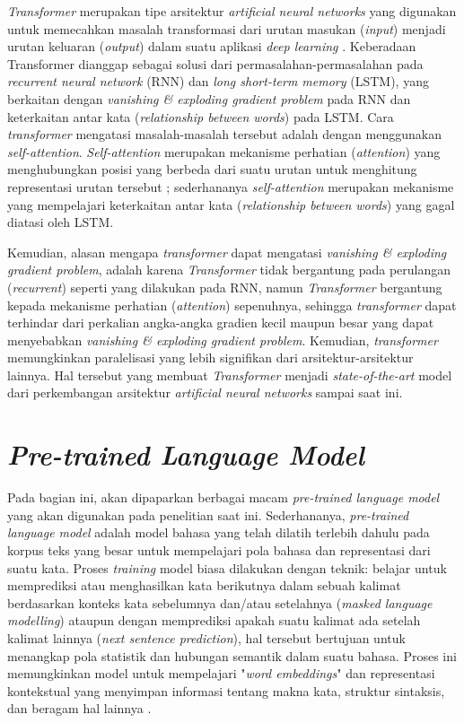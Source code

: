 \emph{Transformer} merupakan tipe arsitektur \emph{artificial neural networks} yang digunakan untuk memecahkan masalah transformasi dari urutan masukan (\emph{input}) menjadi urutan keluaran (\emph{output}) dalam suatu aplikasi \emph{deep learning} \citep{transformers-self-attention-to-the-rescue}. Keberadaan Transformer dianggap sebagai solusi dari permasalahan-permasalahan pada \emph{recurrent neural network} (RNN) dan \emph{long short-term memory} (LSTM), yang berkaitan dengan \emph{vanishing \& exploding gradient problem} pada RNN dan keterkaitan antar kata (\emph{relationship between words}) pada LSTM. Cara \emph{transformer} mengatasi masalah-masalah tersebut adalah dengan menggunakan \emph{self-attention}. \emph{Self-attention} merupakan mekanisme perhatian (\emph{attention}) yang menghubungkan posisi yang berbeda dari suatu urutan untuk menghitung representasi urutan tersebut \citep{DBLP:journals/corr/VaswaniSPUJGKP17}; sederhananya \emph{self-attention} merupakan mekanisme yang mempelajari keterkaitan antar kata (\emph{relationship between words}) yang gagal diatasi oleh LSTM. 

Kemudian, alasan mengapa \emph{transformer} dapat mengatasi \emph{vanishing \& exploding gradient problem}, adalah karena \emph{Transformer} tidak bergantung pada perulangan (\emph{recurrent}) seperti yang dilakukan pada RNN, namun \emph{Transformer} bergantung kepada mekanisme perhatian (\emph{attention}) sepenuhnya, sehingga \emph{transformer} dapat terhindar dari perkalian angka-angka gradien kecil maupun besar yang dapat menyebabkan \emph{vanishing \& exploding gradient problem}. Kemudian, \emph{transformer} memungkinkan paralelisasi yang lebih signifikan dari arsitektur-arsitektur lainnya. Hal tersebut yang membuat \emph{Transformer} menjadi \emph{state-of-the-art} model dari perkembangan arsitektur \emph{artificial neural networks} sampai saat ini.

\section{\emph{Pre-trained Language Model}}
Pada bagian ini, akan dipaparkan berbagai macam \emph{pre-trained language model} yang akan digunakan pada penelitian saat ini. Sederhananya, \emph{pre-trained language model} adalah model bahasa yang telah dilatih terlebih dahulu pada korpus teks yang besar untuk mempelajari pola bahasa dan representasi dari suatu kata. Proses \emph{training} model biasa dilakukan dengan teknik: belajar untuk memprediksi atau menghasilkan kata berikutnya dalam sebuah kalimat berdasarkan konteks kata sebelumnya dan/atau setelahnya (\emph{masked language modelling}) ataupun dengan memprediksi apakah suatu kalimat ada setelah kalimat lainnya (\emph{next sentence prediction}), hal tersebut bertujuan untuk menangkap pola statistik dan hubungan semantik dalam suatu bahasa. Proses ini memungkinkan model untuk mempelajari "\emph{word embeddings}" dan representasi kontekstual yang menyimpan informasi tentang makna kata, struktur sintaksis, dan beragam hal lainnya \citep{radford2018improving}.

